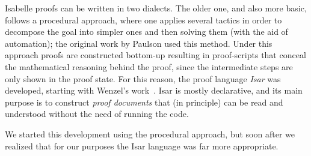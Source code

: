 Isabelle proofs can be written in two dialects.  The older one, and
also more basic, follows a procedural approach, where one applies
several tactics in order to decompose the goal into simpler ones and
then solving them (with the aid of automation); the original work by
Paulson used this method. Under this approach proofs are constructed
bottom-up resulting in proof-scripts that conceal the mathematical
reasoning behind the proof, since the intermediate steps are only
shown in the proof state. For this reason, the proof language
\emph{Isar} was developed, starting with Wenzel's
work~\cite{DBLP:conf/tphol/Wenzel99}. Isar is mostly declarative, and
its main purpose is to construct \emph{proof documents} that (in
principle) can be read and understood without the need of running the
code.

We started this development using the procedural approach, but soon
after we realized that for our purposes the Isar language was far more
appropriate.

